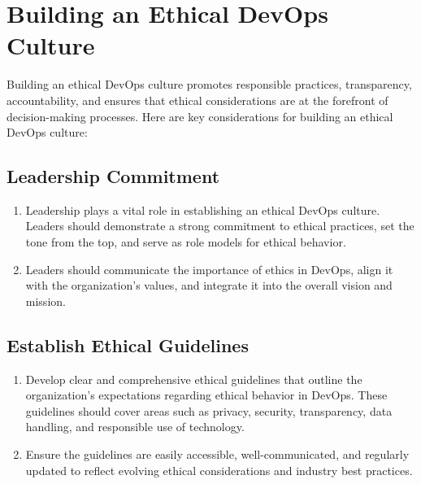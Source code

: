\chapter*{Building an Ethical DevOps Culture}

Building an ethical DevOps culture promotes responsible practices, transparency, accountability, and ensures that ethical considerations are at the forefront of decision-making processes. Here are key considerations for building an ethical DevOps culture:

\section*{Leadership Commitment}
        \begin{enumerate}
            \item Leadership plays a vital role in establishing an ethical DevOps culture. Leaders should demonstrate a strong commitment to ethical practices, set the tone from the top, and serve as role models for ethical behavior.
        
            \item Leaders should communicate the importance of ethics in DevOps, align it with the organization's values, and integrate it into the overall vision and mission.
        \end{enumerate}
    
\section*{Establish Ethical Guidelines}
        \begin{enumerate}
            \item Develop clear and comprehensive ethical guidelines that outline the organization's expectations regarding ethical behavior in DevOps. These guidelines should cover areas such as privacy, security, transparency, data handling, and responsible use of technology.
            
            \item Ensure the guidelines are easily accessible, well-communicated, and regularly updated to reflect evolving ethical considerations and industry best practices.
        \end{enumerate}

